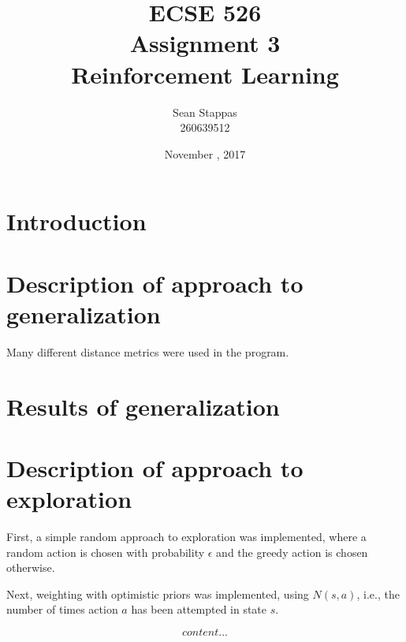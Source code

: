 \documentclass[a4paper,titlepage]{article}
\title{
	\textbf{ECSE 526 \\ Assignment 3}
	\\ \large Reinforcement Learning
}
\author{Sean Stappas \\ 260639512}
\date{November \nth{7}, 2017}
\begin{document}
	\sloppy
	\maketitle
	\twocolumn
	
	\section*{Introduction}
	
	
	\section{Description of approach to generalization}
	
	Many different distance metrics were used in the program.
	
	
	\section{Results of generalization}
	
	
	\section{Description of approach to exploration}
	
	First, a simple random approach to exploration was implemented, where a random action is chosen with probability $\epsilon$ and the greedy action is chosen otherwise.
	
	
	Next, weighting with optimistic priors was implemented, using $N(s, a)$, i.e., the number of times action $a$ has been attempted in state $s$.
	
	\begin{equation}
		content...
	\end{equation}
	
	
\end{document}
